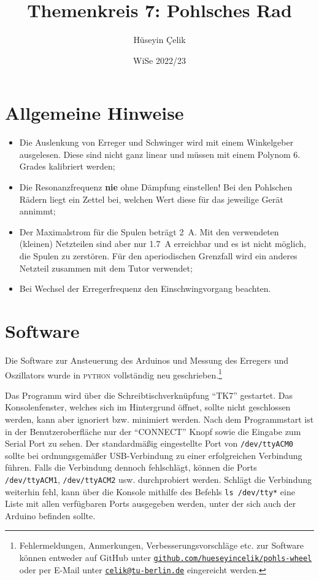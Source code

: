 \documentclass[ngerman,a4paper,11pt]{article}
\title{\bf Themenkreis 7: Pohlsches Rad}
\author{\sc Hüseyin Çelik}
\date{WiSe 2022/23}
\begin{document}
\maketitle
\section*{Allgemeine Hinweise}
\begin{itemize}
  \item Die Auslenkung von Erreger und Schwinger wird mit einem Winkelgeber ausgelesen. Diese sind nicht ganz linear und müssen mit einem Polynom 6. Grades kalibriert werden;
  \item Die Resonanzfrequenz \textbf{nie} ohne Dämpfung einstellen! Bei den Pohlschen Rädern liegt ein Zettel bei, welchen Wert diese für das jeweilige Gerät annimmt;
  \item Der Maximalstrom für die Spulen beträgt \SI{2}{\ampere}. Mit den verwendeten (kleinen) Netzteilen sind aber nur \SI{1.7}{\ampere} erreichbar und es ist nicht möglich, die Spulen zu zerstören. Für den aperiodischen Grenzfall wird ein anderes Netzteil zusammen mit dem Tutor verwendet;
  \item Bei Wechsel der Erregerfrequenz den Einschwingvorgang beachten.
\end{itemize}
\section*{Software}
Die Software zur Ansteuerung des Arduinos und Messung des Erregers und Oszillators wurde in \textsc{python} vollständig neu geschrieben.\footnote{Fehlermeldungen, Anmerkungen, Verbesserungsvorschläge etc. zur Software können entweder auf GitHub unter \href{https://www.github.com/hueseyincelik/pohls-wheel}{\nolinkurl{github.com/hueseyincelik/pohls-wheel}} oder per E-Mail unter \href{mailto:celik@tu-berlin.de}{\nolinkurl{celik@tu-berlin.de}} eingereicht werden.}

Das Programm wird über die Schreibtischverknüpfung \enquote{TK7} gestartet. Das Konsolenfenster, welches sich im Hintergrund öffnet, sollte nicht geschlossen werden, kann aber ignoriert bzw. minimiert werden. Nach dem Programmstart ist in der Benutzeroberfläche nur der \enquote{CONNECT} Knopf sowie die Eingabe zum Serial Port zu sehen. Der standardmäßig eingestellte Port von \texttt{/dev/ttyACM0} sollte bei ordnungsgemäßer USB-Verbindung zu einer erfolgreichen Verbindung führen. Falls die Verbindung dennoch fehlschlägt, können die Ports \texttt{/dev/ttyACM1}, \texttt{/dev/ttyACM2} usw. durchprobiert werden. Schlägt die Verbindung weiterhin fehl, kann über die Konsole mithilfe des Befehls \texttt{ls /dev/tty*} eine Liste mit allen verfügbaren Ports ausgegeben werden, unter der sich auch der Arduino befinden sollte.
\end{document}
